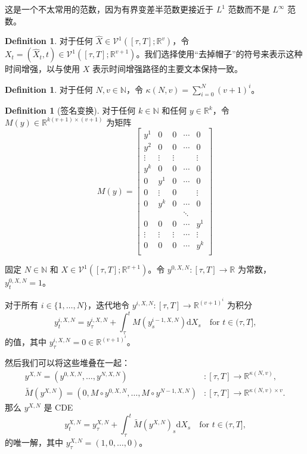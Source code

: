 \documentclass{ctexart}
\theoremstyle{plain}
\theoremstyle{definition}
\newtheorem{definition}[thm]{Definition}
\newcommand{\reals}{\mathbb{R}}
\newcommand{\naturals}{\mathbb{N}}
\begin{document}
这是一个不太常用的范数，因为有界变差半范数更接近于 $L^1$ 范数而不是 $L^\infty$ 范数。
\begin{definition}
对于任何 $\widehat{X} \in \mathcal{V}^1([\tau, T]; \reals^v)$，令 $X_t = (\widehat{X}_t, t) \in \mathcal{V}^1([\tau, T]; \reals^{v + 1})$。我们选择使用“去掉帽子”的符号来表示这种时间增强，以与使用 $X$ 表示时间增强路径的主要文本保持一致。
\end{definition}
\begin{definition}
对于任何 $N, v \in \naturals$，令 $\kappa(N, v) = \sum_{i = 0}^N (v + 1)^i$。
\end{definition}
\begin{definition}[签名变换]\label{definition:signature}
对于任何 $k \in \naturals$ 和任何 $y \in \reals^k$，令 $M(y) \in \reals^{k(v + 1) \times (v + 1)}$ 为矩阵
\begin{equation*}
	M(y) =
\begin{bmatrix}
	y^1 & 0 & 0 & \cdots & 0\\
	y^2 & 0 & 0 & \cdots & 0\\
	\vdots & \vdots & \vdots && \vdots\\
	y^k & 0 & 0 & \cdots & 0\\
	0 & y^1 & 0 & \cdots & 0\\
	0 & \vdots & 0 && \vdots\\
	0 & y^k & 0 & \cdots & 0 \\
	&&&\ddots\\
	0 & 0 & 0 & \cdots & y^1\\
	\vdots & \vdots & \vdots & \cdots & \vdots\\
	0 & 0 & 0 & \cdots & y^k\\
\end{bmatrix}
\end{equation*}

固定 $N \in \naturals$ 和 $X \in \mathcal{V}^1([\tau, T]; \reals^{v + 1})$。令 $y^{0, X, N} \colon [\tau, T] \to \reals$ 为常数，$y^{0, X, N}_t = 1$。

对于所有 $i \in \{1, \ldots, N\}$，迭代地令 $y^{i, X, N} \colon [\tau, T] \to \reals^{(v + 1)^i}$ 为积分
\begin{equation*}
	y^{i, X, N}_t = y^{i, X, N}_\tau + \int_\tau^t M(y^{i-1, X, N}_s) \mathrm{d}X_s\quad\text{for $t \in (\tau, T]$,}
\end{equation*}
的值，其中 $y^{i, X, N}_\tau = 0 \in \reals^{(v + 1)^i}$。

然后我们可以将这些堆叠在一起：
\begin{align*}
	y^{X, N} = (y^{0, X, N}, \ldots, y^{N, X, N}) &\colon [\tau, T] \to \reals^{\kappa(N, v)},\\
	\widetilde{M}(y^{X, N}) = (0, M \circ y^{0, X, N}, \ldots, M \circ y^{N-1, X, N}) &\colon [\tau, T] \to \reals^{\kappa(N, v) \times v}.
\end{align*}
那么 $y^{X, N}$ 是 CDE
\begin{equation*}
	y^{X, N}_t = y^{X, N}_\tau + \int_\tau^t \widetilde{M}(y^{X, N})_s \mathrm{d}X_s\quad\text{for $t \in (\tau, T]$,}
\end{equation*}
的唯一解，其中 $y^{X, N}_\tau = (1, 0, \ldots, 0)$。


\end{definition}
\end{document}
